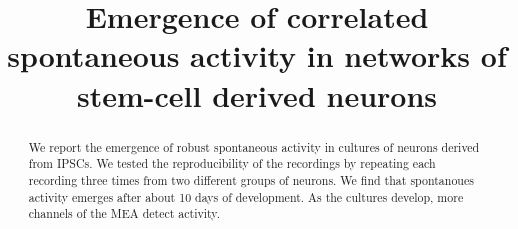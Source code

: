 \documentclass[doublespacing]{bmcart}
\begin{document}
\begin{frontmatter}

\begin{fmbox}

\title{Emergence of correlated spontaneous activity in networks of stem-cell derived neurons}

\author[
   addressref={aff2},
   noteref={n1}
   ]{ }
\author[
   addressref={aff1},
   noteref={n1}
]{ }
\author[
   addressref={aff1},
]{ }
\author[addressref={aff1},noteref={n2}]{
   }
\author[addressref={aff1},noteref={n2}]{
   }
\author[
   addressref={aff2},
   noteref={n2},
   email={sje30@cam.ac.uk}
]{ }

\address[id=aff1]{
    ,
    ,
    ,
}

\address[id=aff2]{
    ,
    ,
    ,
}

\begin{artnotes}


\end{artnotes}

\end{fmbox}

\begin{abstractbox}

\begin{abstract}

We report the emergence of robust spontaneous activity in cultures of
neurons derived from IPSCs.  We tested the reproducibility of the recordings by repeating each recording three times from two different groups of neurons.  We find that spontanoues activity emerges after about 10 days of development.  As the cultures develop, more channels of the MEA detect activity.  

\end{abstract}

\begin{keyword}


\end{keyword}
\end{abstractbox}
\end{frontmatter}
\end{document}
